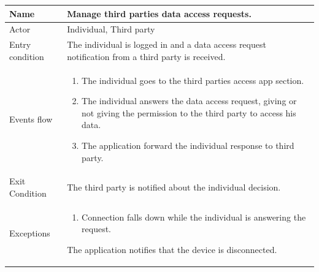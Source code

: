 \begin{tabular}{|l|p{11cm}|}
    \hline
    Name & Manage third parties data access requests.
    \\ \hline
    Actor & Individual, Third party
    \\ \hline 
    Entry condition & The individual is logged in and a data access request notification from a third party is received.
    \\ \hline
    Events flow &
    \begin{enumerate}
	\item The individual goes to the third parties access app section.
    \item The individual answers the data access request, giving or not giving the permission to the third party to access his data.
    \item The application forward the individual response to third party.
    \end{enumerate}
     \\ \hline
     Exit Condition & The third party is notified about the individual decision.
     \\
    \hline
    Exceptions &
        \begin{enumerate}
    \item Connection falls down while the individual is answering the request.
    \end{enumerate}
The application notifies that the device is disconnected.
      \\
    \hline
\end{tabular}



